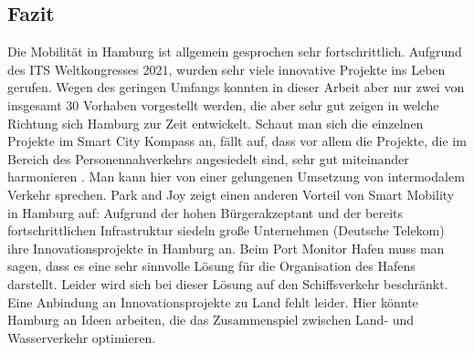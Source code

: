 \subsection{Fazit}

Die Mobilität in Hamburg ist allgemein gesprochen sehr fortschrittlich. Aufgrund des ITS Weltkongresses 2021, wurden sehr viele innovative Projekte ins Leben gerufen.
Wegen des geringen Umfangs konnten in dieser Arbeit aber nur zwei von insgesamt 30 Vorhaben vorgestellt werden, die aber sehr gut zeigen in welche Richtung sich Hamburg zur Zeit entwickelt. 
Schaut man sich die einzelnen Projekte im Smart City Kompass an, fällt auf, dass vor allem die Projekte, die im Bereich des Personennahverkehrs angesiedelt sind, sehr gut miteinander harmonieren \autocite[vgl.][]{SmartCityKompass.2020d}.
Man kann hier von einer gelungenen Umsetzung von intermodalem Verkehr sprechen. Park and Joy zeigt einen anderen Vorteil von Smart Mobility in Hamburg auf: Aufgrund der hohen Bürgerakzeptant und der bereits fortschrittlichen Infrastruktur siedeln große Unternehmen (Deutsche Telekom) ihre Innovationsprojekte in Hamburg an.
Beim Port Monitor Hafen muss man sagen, dass es eine sehr sinnvolle Lösung für die Organisation des Hafens darstellt. Leider wird sich bei dieser Lösung auf den Schiffsverkehr beschränkt.
Eine Anbindung an Innovationsprojekte zu Land fehlt leider. Hier könnte Hamburg an Ideen arbeiten, die das Zusammenspiel zwischen Land- und Wasserverkehr optimieren.
